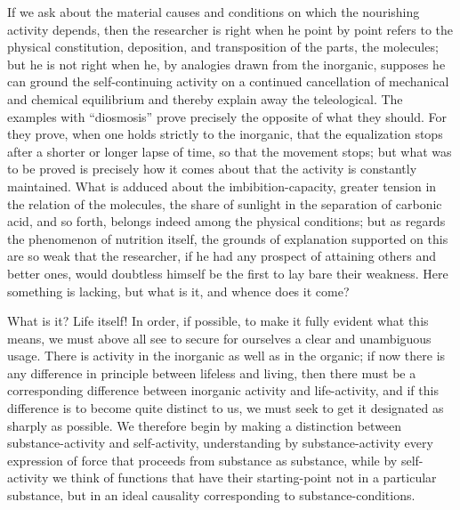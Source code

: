 \documentclass[12pt]{book}
\begin{document}
If we ask about the material causes and conditions on which the nourishing activity
depends, then the researcher is right when he point by point refers to the physical
constitution, deposition, and transposition of the parts, the molecules; but he is not
right when he, by analogies drawn from the inorganic, supposes he can ground the
self-continuing activity on a continued cancellation of mechanical and chemical
equilibrium and thereby explain away the teleological. The examples with ``diosmosis''
prove precisely the opposite of what they should. For they prove, when one holds strictly
to the inorganic, that the equalization stops after a shorter or longer lapse of time, so
that the movement stops; but what was to be proved is precisely how it comes about that the
activity is constantly maintained. What is adduced about the imbibition-capacity, greater
tension in the relation of the molecules, the share of sunlight in the separation of
carbonic acid, and so forth, belongs indeed among the physical conditions; but as regards
the phenomenon of nutrition itself, the grounds of explanation supported on this are so
weak that the researcher, if he had any prospect of attaining others and better ones,
would doubtless himself be the first to lay bare their weakness. Here something is lacking,
but what is it, and whence does it come?

What is it? Life itself! In order, if possible, to make it fully evident what this means,
we must above all see to secure for ourselves a clear and unambiguous usage. There is
activity in the inorganic as well as in the organic; if now there is any difference in
principle between lifeless and living, then there must be a corresponding difference
between inorganic activity and life-activity, and if this difference is to become quite
distinct to us, we must seek to get it designated as sharply as possible. We therefore
begin by making a distinction between substance-activity and self-activity, understanding
by substance-activity every expression of force that proceeds from substance as substance,
while by self-activity we think of functions that have their starting-point not in a
particular substance, but in an ideal causality corresponding to substance-conditions.
\end{document}
